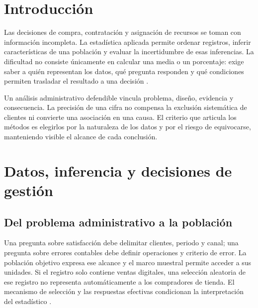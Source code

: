 \documentclass[
	spanish,
	letterpaper, oneside
]{article}
\begin{document}

\templatePagecfg
\onehalfspacing
\templateFinalcfg
\hypersetup{hidelinks}
\justifying
\section{Introducción}
Las decisiones de compra, contratación y asignación de recursos se toman con información incompleta. La estadística aplicada permite ordenar registros, inferir características de una población y evaluar la incertidumbre de esas inferencias. La dificultad no consiste únicamente en calcular una media o un porcentaje: exige saber a quién representan los datos, qué pregunta responden y qué condiciones permiten trasladar el resultado a una decisión \citep{holmesBusiness2023}.

Un análisis administrativo defendible vincula problema, diseño, evidencia y consecuencia. La precisión de una cifra no compensa la exclusión sistemática de clientes ni convierte una asociación en una causa. El criterio que articula los métodos es elegirlos por la naturaleza de los datos y por el riesgo de equivocarse, manteniendo visible el alcance de cada conclusión.

\section{Datos, inferencia y decisiones de gestión}
\subsection{Del problema administrativo a la población}
Una pregunta sobre satisfacción debe delimitar clientes, periodo y canal; una pregunta sobre errores contables debe definir operaciones y criterio de error. La población objetivo expresa ese alcance y el marco muestral permite acceder a sus unidades. Si el registro solo contiene ventas digitales, una selección aleatoria de ese registro no representa automáticamente a los compradores de tienda. El mecanismo de selección y las respuestas efectivas condicionan la interpretación del estadístico \citep{holmesBusiness2023,bradley2021}.
\end{document}
